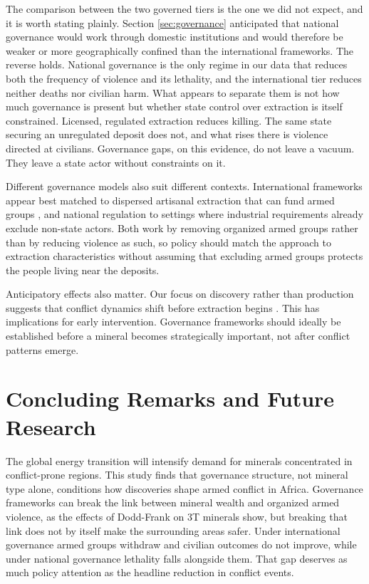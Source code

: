 \documentclass[11pt]{article}
\begin{document}
The comparison between the two governed tiers is the one we did not expect, and it is worth stating plainly. Section \ref{sec:governance} anticipated that national governance would work through domestic institutions and would therefore be weaker or more geographically confined than the international frameworks. The reverse holds. National governance is the only regime in our data that reduces both the frequency of violence and its lethality, and the international tier reduces neither deaths nor civilian harm. What appears to separate them is not how much governance is present but whether state control over extraction is itself constrained. Licensed, regulated extraction reduces killing. The same state securing an unregulated deposit does not, and what rises there is violence directed at civilians. Governance gaps, on this evidence, do not leave a vacuum. They leave a state actor without constraints on it.

Different governance models also suit different contexts. International frameworks appear best matched to dispersed artisanal extraction that can fund armed groups \citep{radley2021artisanal}, and national regulation to settings where industrial requirements already exclude non-state actors. Both work by removing organized armed groups rather than by reducing violence as such, so policy should match the approach to extraction characteristics without assuming that excluding armed groups protects the people living near the deposits.

Anticipatory effects also matter. Our focus on discovery rather than production suggests that conflict dynamics shift before extraction begins \citep{cotet2013oil, arezki2017natural}. This has implications for early intervention. Governance frameworks should ideally be established before a mineral becomes strategically important, not after conflict patterns emerge.

\section{Concluding Remarks and Future Research}
\label{sec:conclusion}

The global energy transition will intensify demand for minerals concentrated in conflict-prone regions. This study finds that governance structure, not mineral type alone, conditions how discoveries shape armed conflict in Africa. Governance frameworks can break the link between mineral wealth and organized armed violence, as the effects of Dodd-Frank on 3T minerals show, but breaking that link does not by itself make the surrounding areas safer. Under international governance armed groups withdraw and civilian outcomes do not improve, while under national governance lethality falls alongside them. That gap deserves as much policy attention as the headline reduction in conflict events.
\end{document}
